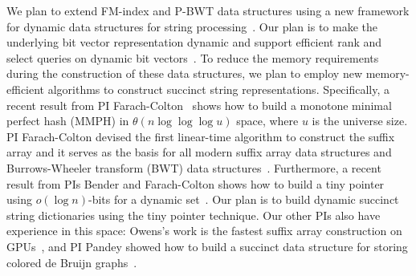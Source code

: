 We plan to extend FM-index and P-BWT data structures using a new framework for dynamic data structures for string processing~\cite{Nicola17,Farzan2011}. Our plan is to make the underlying bit vector representation dynamic and support efficient rank and select queries on dynamic bit vectors~\cite{Raman2001}.
To reduce the memory requirements during the construction of these data structures, we plan to employ new memory-efficient algorithms to construct succinct string representations. Specifically, a recent result from PI Farach-Colton~\cite{Assadi2023} shows how to build a monotone minimal perfect hash (MMPH) in $\theta(n \log{\log{\log u}})$ space, where $u$ is the universe size.
%
PI Farach-Colton devised the first linear-time algorithm to construct the suffix array and it serves as the basis for all modern suffix array data structures and Burrows-Wheeler transform (BWT) data structures~\cite{Farach97,Ambainis97}. Furthermore, a recent result from PIs Bender and Farach-Colton shows how to build a tiny pointer using $o(\log{n})$-bits for a dynamic set~\cite{Bender2023}. Our plan is to build dynamic succinct string dictionaries using the tiny pointer technique. Our other PIs also have experience in this space:
Owens's work is the fastest suffix array construction on GPUs~\cite{Wang:2016:FPS}, and PI Pandey showed how to build a succinct data structure for storing colored de Bruijn graphs~\cite{almodaresi2017rainbowfish}.

